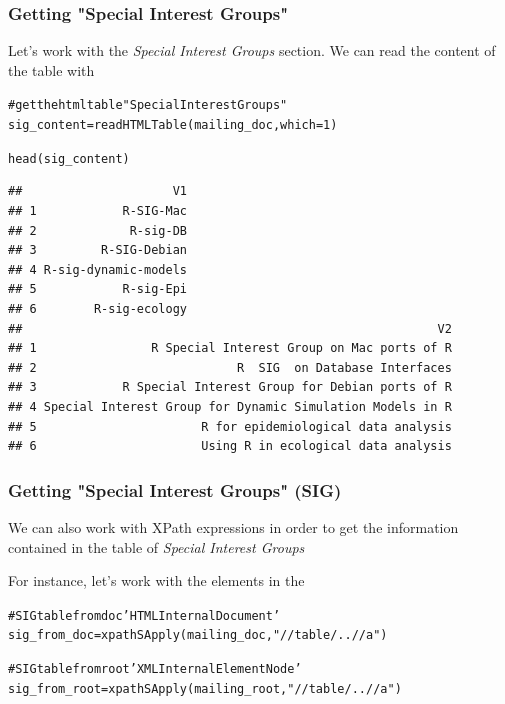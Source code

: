 \documentclass{beamer}\usepackage[]{graphicx}\usepackage[]{color}
\makeatletter
\newcommand{\hlnum}[1]{\textcolor[rgb]{0.063,0.58,0.627}{#1}}%
\newcommand{\hlstr}[1]{\textcolor[rgb]{0.063,0.58,0.627}{#1}}%
\newcommand{\hlcom}[1]{\textcolor[rgb]{0.588,0.588,0.588}{#1}}%
\newcommand{\hlstd}[1]{\textcolor[rgb]{0.196,0.196,0.196}{#1}}%
\newcommand{\hlkwb}[1]{\textcolor[rgb]{0.627,0,0.314}{#1}}%
\newcommand{\hlkwc}[1]{\textcolor[rgb]{0,0.631,0.314}{#1}}%
\newcommand{\hlkwd}[1]{\textcolor[rgb]{0.78,0.227,0.412}{#1}}%
\newenvironment{kframe}{%
 \def\at@end@of@kframe{}%
 \ifinner\ifhmode%
  \def\at@end@of@kframe{\end{minipage}}%
  \begin{minipage}{\columnwidth}%
 \fi\fi%
 \def\FrameCommand##1{\hskip\@totalleftmargin \hskip-\fboxsep
 \colorbox{shadecolor}{##1}\hskip-\fboxsep
     \hskip-\linewidth \hskip-\@totalleftmargin \hskip\columnwidth}%
 \MakeFramed {\advance\hsize-\width
   \@totalleftmargin\z@ \linewidth\hsize
   \@setminipage}}%
 {\par\unskip\endMakeFramed%
 \at@end@of@kframe}
\newenvironment{knitrout}{}{} %
\makeatother
\begin{document}
\begin{frame}[fragile]
\frametitle{Getting "Special Interest Groups"}

Let's work with the \textit{Special Interest Groups} section. We can read the content of the table with 

\begin{knitrout}\tiny
{}\color{fgcolor}\begin{kframe}
\begin{alltt}
\hlcom{# get the html table "Special Interest Groups"}
\hlstd{sig_content} \hlkwb{=} \hlkwd{readHTMLTable}\hlstd{(mailing_doc,} \hlkwc{which} \hlstd{=} \hlnum{1}\hlstd{)}

\hlkwd{head}\hlstd{(sig_content)}
\end{alltt}
\begin{verbatim}
##                     V1
## 1            R-SIG-Mac
## 2             R-sig-DB
## 3         R-SIG-Debian
## 4 R-sig-dynamic-models
## 5            R-sig-Epi
## 6        R-sig-ecology
##                                                          V2
## 1                R Special Interest Group on Mac ports of R
## 2                            R  SIG  on Database Interfaces
## 3            R Special Interest Group for Debian ports of R
## 4 Special Interest Group for Dynamic Simulation Models in R
## 5                       R for epidemiological data analysis
## 6                       Using R in ecological data analysis
\end{verbatim}
\end{kframe}
\end{knitrout}

\end{frame}


\begin{frame}[fragile]
\frametitle{Getting "Special Interest Groups" (SIG)}

We can also work with XPath expressions in order to get the information contained in the table of \textit{Special Interest Groups}

\bigskip

For instance, let's work with the  elements in the  

\begin{knitrout}\tiny
{}\color{fgcolor}\begin{kframe}
\begin{alltt}
\hlcom{# SIG table from doc 'HTMLInternalDocument'}
\hlstd{sig_from_doc} \hlkwb{=} \hlkwd{xpathSApply}\hlstd{(mailing_doc,} \hlstr{"//table/..//a"}\hlstd{)}

\hlcom{# SIG table from root 'XMLInternalElementNode'}
\hlstd{sig_from_root} \hlkwb{=} \hlkwd{xpathSApply}\hlstd{(mailing_root,} \hlstr{"//table/..//a"}\hlstd{)}
\end{alltt}
\end{kframe}
\end{knitrout}

\end{frame}
\end{document}
